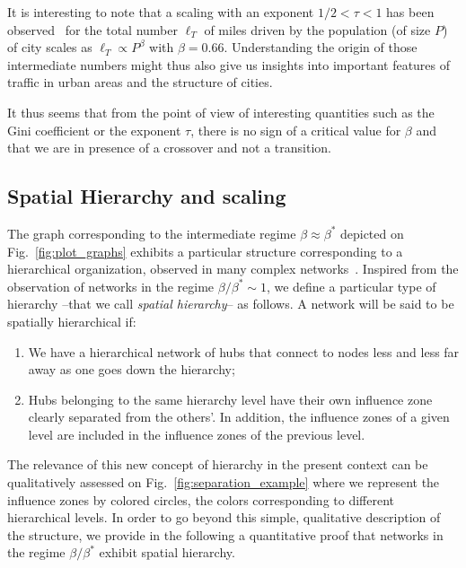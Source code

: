 It is interesting to note that a scaling with an exponent $1/2<\tau < 1$ has been observed~\cite{Samaniego:2008,Barthelemy:2011} for the total number $\ell_T$ of miles driven by the population (of size $P$) of city scales as $\ell_T \propto P^{\beta}$ with $\beta=0.66$. Understanding the origin of those intermediate numbers might thus also give us insights into important features of traffic in urban areas and the structure of cities.

It thus seems that from the point of view of interesting quantities such as the Gini coefficient or the exponent $\tau$, there is no sign of a critical value for $\beta$ and that we are in presence of a crossover and not a transition.


\subsection{Spatial Hierarchy and scaling}

The graph corresponding to the intermediate regime $\beta \approx \beta^*$ depicted on Fig.~\ref{fig:plot_graphs} exhibits a particular structure corresponding to a hierarchical organization, observed in many complex networks~\cite{Sales-Pardo:2007}. Inspired from the observation of networks in the regime $\beta/\beta^* \sim 1$, we define a particular type of hierarchy --that we call \emph{spatial hierarchy}-- as follows. A network will be said to be spatially hierarchical if:

\begin{enumerate}
\item  We have a hierarchical network of hubs that connect to nodes less and less far away as one goes down the hierarchy;
\item Hubs belonging to the same hierarchy level have their own influence zone clearly separated from the others'. In addition, the influence zones of a given level are included in the influence zones of the previous level.
\end{enumerate} 

The relevance of this new concept of hierarchy in the present context can be qualitatively assessed on Fig.~\ref{fig:separation_example} where we represent the influence zones by colored circles, the colors corresponding to different hierarchical levels. In order to go beyond this simple, qualitative description of the structure, we provide in the following a quantitative proof that networks in the regime $\beta / \beta^*$ exhibit spatial hierarchy.

